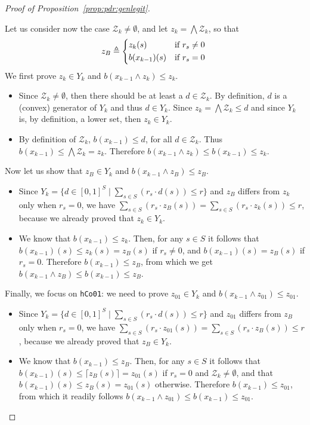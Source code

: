 \begin{proof}[Proof of Proposition~\ref{prop:pdr:genlegit}]
\begin{itemize}
		      Let us consider now the case $\mathcal{Z}_k \neq \emptyset$, and let $z_k = \bigwedge \mathcal{Z}_k$, so that
		      \begin{equation*}
			      z_{B} \eqdef
			      \begin{cases*}
				      z_k(s)        & if $r_s \neq 0$ \\
				      b(x_{k-1})(s) & if $r_s = 0$
			      \end{cases*}
		      \end{equation*}
		      We first prove  $z_k\in Y_k$ and $b(x_{k-1} \wedge z_k) \leq z_k$.
		      \begin{itemize}
			      \item Since $\mathcal{Z}_k \neq \emptyset$, then there should be at least a $d \in \mathcal{Z}_k$. By definition, $d$ is a (convex) generator of $Y_k$ and thus $d\in Y_k$. Since $z_k=\bigwedge \mathcal{Z}_k \leq d$ and since $Y_k$ is, by definition, a lower set, then $z_k\in Y_k$.
			      \item By definition of $\mathcal{Z}_k$, $b(x_{k-1})\leq d$, for all $d\in \mathcal{Z}_k$. Thus $b(x_{k-1})\leq \bigwedge \mathcal{Z}_k =z_k$. Therefore $b(x_{k-1} \wedge z_k) \leq b(x_{k-1}) \leq z_k$.
		      \end{itemize}
		      Now let us show that $z_B\in Y_k$ and $b(x_{k-1} \wedge z_B) \leq z_B$.
		      \begin{itemize}
			      \item Since $Y_k=\{d\in [0,1]^S \mid \sum_{s\in S}(r_s \cdot d(s)) \leq r \}$ and $z_B$ differs from $z_k$ only when $r_s=0$, we have $\sum_{s\in S}(r_s \cdot z_B(s)) = \sum_{s\in S}(r_s \cdot z_k(s)) \leq r$, because we already proved that $z_k\in Y_k$.
			      \item We know that $b(x_{k-1})\leq z_k$. Then, for any $s\in S$ it follows that $b(x_{k-1})(s)\leq z_k(s) = z_B(s)$ if $r_s \neq 0$, and $b(x_{k-1})(s) = z_B(s)$  if $r_s = 0$. Therefore $b(x_{k-1})\leq z_B$, from which we get $b(x_{k-1} \wedge z_B) \leq b(x_{k-1}) \leq z_B$.
		      \end{itemize}

		      Finally, we focus on \verb|hCo01|: we need to prove $z_{01}\in Y_k$ and $b(x_{k-1} \wedge z_{01}) \leq z_{01}$.
		      \begin{itemize}
			      \item Since $Y_k=\{d\in [0,1]^S \mid \sum_{s\in S}(r_s \cdot d(s)) \leq r \}$ and $z_{01}$ differs from $z_B$ only when $r_s=0$, we have $\sum_{s\in S}(r_s \cdot z_{01}(s)) = \sum_{s\in S}(r_s \cdot z_B(s)) \leq r$, because we already proved that $z_B\in Y_k$.
			      \item We know that $b(x_{k-1})\leq z_B$.
			            Then, for any $s\in S$ it follows that $b(x_{k-1})(s) \leq \lceil z_B(s)\rceil = z_{01}(s)$  if $r_s = 0$ and $\mathcal{Z}_k\neq \emptyset$, and that $b(x_{k-1})(s)\leq z_B(s) = z_{01}(s)$ otherwise. Therefore $b(x_{k-1})\leq z_{01}$, from which it readily follows $b(x_{k-1} \wedge z_{01}) \leq b(x_{k-1}) \leq z_{01}$.
		      \end{itemize}
	\end{itemize}
\end{proof}

